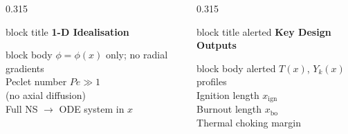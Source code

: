 \documentclass[12pt,aspectratio=169]{beamer}
\begin{document}
{\begin{frame}[plain, c]
\begin{columns}[t, totalwidth=\textwidth]
    \begin{column}{0.315\textwidth}
      \begin{beamercolorbox}[rounded=true, wd=\linewidth,
                             sep=6pt, center]{block title}
        \textbf{\small 1-D Idealisation}
      \end{beamercolorbox}
      \vspace{3pt}
      \begin{beamercolorbox}[rounded=true, wd=\linewidth,
                             sep=6pt, center]{block body}
        \color{ashgrey}\fontsize{7.5}{10}\selectfont
        $\phi=\phi(x)$ only; no radial gradients\\[3pt]
        Peclet number $Pe\gg 1$\\
        (no axial diffusion)\\[3pt]
        Full NS $\to$ ODE system in $x$
      \end{beamercolorbox}
    \end{column}
 
    \hfill
 
    \begin{column}{0.315\textwidth}
      \begin{beamercolorbox}[rounded=true, wd=\linewidth,
                             sep=6pt, center]{block title alerted}
        \textbf{\small Key Design Outputs}
      \end{beamercolorbox}
      \vspace{3pt}
      \begin{beamercolorbox}[rounded=true, wd=\linewidth,
                             sep=6pt, center]{block body alerted}
        \color{ashgrey}\fontsize{7.5}{10}\selectfont
        $T(x)$, $Y_k(x)$ profiles\\[3pt]
        Ignition length $x_{\text{ign}}$\\[3pt]
        Burnout length $x_{\text{bo}}$\\[3pt]
        Thermal choking margin
      \end{beamercolorbox}
    \end{column}
 
    \hfill
 

\end{columns}
\end{frame}}
\end{document}
